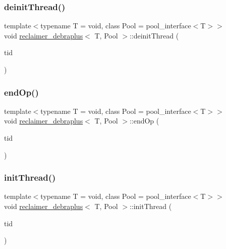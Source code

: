 \subsubsection{\texorpdfstring{deinit\+Thread()}{deinitThread()}}
{\footnotesize\ttfamily template$<$typename T  = void, class Pool  = pool\+\_\+interface$<$\+T$>$$>$ \\
void \hyperlink{classreclaimer__debraplus}{reclaimer\+\_\+debraplus}$<$ T, Pool $>$\+::deinit\+Thread (\begin{DoxyParamCaption}\item[{const int}]{tid }\end{DoxyParamCaption})\hspace{0.3cm}{\ttfamily [inline]}}

\mbox{\label{classreclaimer__debraplus_a2c702367af049f905ff76101b340d22f}} 
\subsubsection{\texorpdfstring{end\+Op()}{endOp()}}
{\footnotesize\ttfamily template$<$typename T  = void, class Pool  = pool\+\_\+interface$<$\+T$>$$>$ \\
void \hyperlink{classreclaimer__debraplus}{reclaimer\+\_\+debraplus}$<$ T, Pool $>$\+::end\+Op (\begin{DoxyParamCaption}\item[{const int}]{tid }\end{DoxyParamCaption})\hspace{0.3cm}{\ttfamily [inline]}}

\mbox{\label{classreclaimer__debraplus_aa102a69aaf1bc87bbc7dd27b0e5d9c0d}} 
\subsubsection{\texorpdfstring{init\+Thread()}{initThread()}}
{\footnotesize\ttfamily template$<$typename T  = void, class Pool  = pool\+\_\+interface$<$\+T$>$$>$ \\
void \hyperlink{classreclaimer__debraplus}{reclaimer\+\_\+debraplus}$<$ T, Pool $>$\+::init\+Thread (\begin{DoxyParamCaption}\item[{const int}]{tid }\end{DoxyParamCaption})\hspace{0.3cm}{\ttfamily [inline]}}

